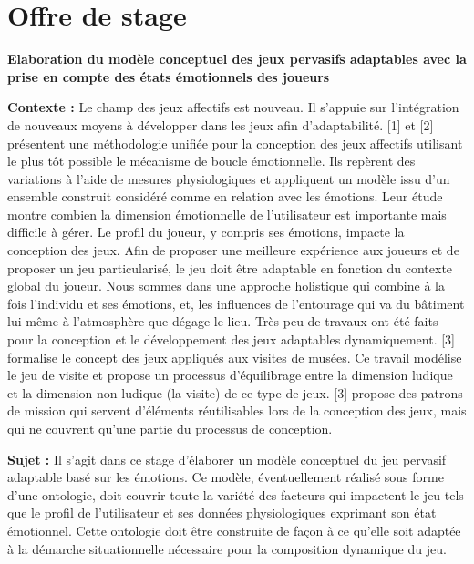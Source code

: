 \documentclass[11pt]{article}
\begin{document}
\section{Offre de stage}\label{app:annexe1}
	\textbf{Elaboration du modèle conceptuel des jeux pervasifs adaptables avec la prise en compte des états émotionnels des joueurs}\par
	\medskip
	\textbf{Contexte :}\newline
	Le champ des jeux affectifs est nouveau. Il s’appuie sur l’intégration de nouveaux moyens à développer dans les jeux afin d’adaptabilité. [1] et [2] présentent une méthodologie unifiée pour la conception des jeux affectifs utilisant le plus tôt possible le mécanisme de boucle émotionnelle. Ils repèrent des variations à l’aide de mesures physiologiques et appliquent un modèle issu d’un ensemble construit considéré comme en relation avec les émotions. Leur étude montre combien la dimension émotionnelle de l’utilisateur est importante mais difficile à gérer.\newline
	Le profil du joueur, y compris ses émotions, impacte la conception des jeux. Afin de proposer une meilleure expérience aux joueurs et de proposer un jeu particularisé, le jeu doit être adaptable en fonction du contexte global du joueur. Nous sommes dans une approche holistique qui combine à la fois l’individu et ses émotions, et, les influences de l’entourage qui va du bâtiment lui-même à l’atmosphère que dégage le lieu. Très peu de travaux ont été faits pour la conception et le développement des jeux adaptables dynamiquement. [3] formalise le concept des jeux appliqués aux visites de musées. Ce travail modélise le jeu de visite et propose un processus d’équilibrage entre la dimension ludique et la dimension non ludique (la visite) de ce type de jeux. [3] propose des patrons de mission qui servent d’éléments réutilisables lors de la conception des jeux, mais qui ne couvrent qu’une partie du processus de conception.\par
	\textbf{Sujet :}\newline
	Il s’agit dans ce stage d’élaborer un modèle conceptuel du jeu pervasif adaptable basé sur les émotions. Ce modèle, éventuellement réalisé sous forme d’une ontologie, doit couvrir toute la variété des facteurs qui impactent le jeu tels que le profil de l’utilisateur et ses données physiologiques exprimant son état émotionnel. Cette ontologie doit être construite de façon à ce qu’elle soit adaptée à la démarche situationnelle nécessaire pour la composition dynamique du jeu.
\end{document}
